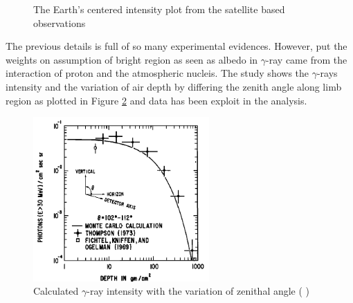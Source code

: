 \begin{figure}[h!]
    \centering
        \hfill
        \caption{
            The Earth's centered intensity plot from the satellite based observations
        }
       \label{fig:gamma_earth_second_wave}
\end{figure}

The previous details is full of so many experimental evidences.
However, \cite{Morris84} put the weights on assumption of 
bright region as seen as albedo in $\gamma$-ray came from the 
interaction of proton and the atmospheric nucleis. The study
shows the $\gamma$-rays intensity and the variation of air depth 
by differing the zenith angle along limb region as plotted in 
Figure \ref{fig:emit_photon_vs_depth} and \cite{Thompson81} data 
has been exploit in the analysis.

\begin{figure}[h!]
    \centering
    \includegraphics[width=0.6\textwidth]{content/literature_review/figures/morris_photon_vs_depth}
    \caption{
        Calculated $\gamma$-ray intensity with the variation of 
        zenithal angle
        (\cite{Morris84} )
    }
    \label{fig:emit_photon_vs_depth}
\end{figure}

